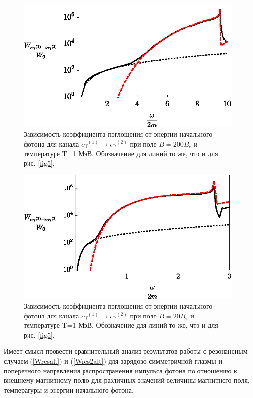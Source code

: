 \documentclass[cp1251%
               ]{jetp} %
\begin{document}
\begin{figure}[t!]\centering
	\includegraphics[width=0.9\linewidth]{fig7.eps}
	\caption{Зависимость коэффициента поглощения от энергии начального фотона для канала $e\gamma^{(1)}\to e\gamma^{(2)}$ при поле $B=200 B_e$ и температуре T=1 МэВ. Обозначение для линий то же, что и для рис. \ref{fig5}.}
	\label{fig7}
\end{figure}

\begin{figure}[t!]\centering
	\includegraphics[width=0.9\linewidth]{fig8.eps}
	\caption{Зависимость коэффициента поглощения от энергии начального фотона для канала $e\gamma^{(1)}\to e\gamma^{(2)}$ при поле $B=20 B_e$ и температуре T=1 МэВ. Обозначение для линий то же, что и для рис. \ref{fig5}.}
	\label{fig8}
\end{figure}

Имеет смысл провести сравнительный анализ результатов работы \cite{Chistyakov:2009}  с резонансным случаем (\ref{Wresalt}) и (\ref{Wres2alt}) для зарядово-симметричной плазмы и поперечного направления распространения импульса фотона по отношению к внешнему магнитному полю для различных значений величины магнитного поля, температуры и энергии начального фотона.
\end{document}
